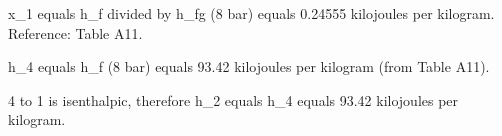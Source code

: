 x_1 equals h_f divided by h_fg (8 bar) equals 0.24555 kilojoules per kilogram.  
Reference: Table A11.  

h_4 equals h_f (8 bar) equals 93.42 kilojoules per kilogram (from Table A11).  

4 to 1 is isenthalpic, therefore h_2 equals h_4 equals 93.42 kilojoules per kilogram.